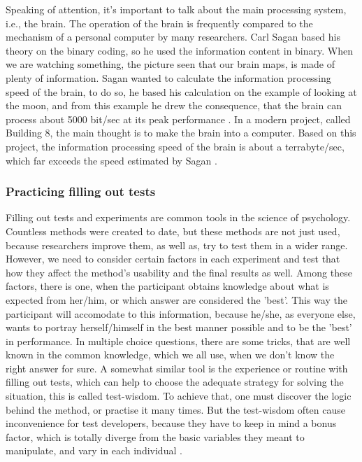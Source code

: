 Speaking of attention, it’s important to talk about the main processing system, i.e., the brain. The operation of the brain is frequently compared to the mechanism of a personal computer 
by many researchers. 
Carl Sagan based his theory on the binary coding, 
so he used the information content in binary. 
When we are watching something, the picture seen that our brain maps, is made of plenty of information. 
Sagan wanted to calculate the 
information processing 
speed of the brain, to do so, he based his calculation on the example of looking at the moon, and from this example he drew the consequence, that the brain can process about 5000 bit/sec at its peak performance \cite{Sagan}. In a modern project, called Building 8, the main thought is to make the brain into a computer. Based on this project, the
information processing speed of the brain 
is about a terrabyte/sec, which far exceeds the speed estimated by Sagan \cite{Nieva}.  

\subsubsection{Practicing filling out tests}

Filling out tests and experiments are common tools in the science of psychology. Countless methods were 
created to date, but these methods are not just used, because researchers improve them, as well as, try to test them in a wider range. However, we need to consider certain factors in each experiment 
and test
that how they affect the method’s usability and the final results as well. Among these factors, there is one, when the participant obtains knowledge about what is expected from her/him, 
or which answer are considered the ’best’. This way the participant will accomodate to this information, because he/she, as everyone else, wants to portray herself/himself in the best manner possible and to be the ’best’ in performance. In multiple choice questions, there are some tricks, that are well known in the common knowledge, which we all use, when we don’t know the right answer for sure. A somewhat similar tool is the experience or 
routine with filling out tests, which can help to choose the adequate strategy for solving the situation, this is called test-wisdom. To achieve that, one must discover the logic behind the method, or practise it many times. But the test-wisdom often cause inconvenience for  
test developers, because they have to keep in mind a bonus factor, which is totally diverge from the basic variables they meant to manipulate, and vary in each individual \cite{PszichoMeresbook}.

